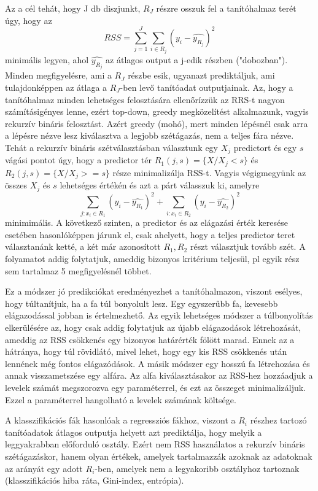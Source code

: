 \documentclass[12pt]{article}
\theoremstyle{plain}
\begin{document}
Az a cél tehát, hogy J db diszjunkt, $R_J$ részre osszuk fel a tanítóhalmaz terét úgy, hogy az $$ RSS = \sum_{j=1}^J \sum_{i \in R_j} (y_i - \hat{y_{R_j}})^2$$ minimális legyen, ahol $\hat{y_{R_j}}$ az átlagos output a j-edik részben ("dobozban"). Minden megfigyelésre, ami a $R_J$ részbe esik, ugyanazt prediktáljuk, ami tulajdonképpen az átlaga a $R_J$-ben levő tanítóadat outputjainak. Az, hogy a tanítóhalmaz minden lehetséges felosztására ellenőrízzük az RRS-t nagyon számításigényes lenne, ezért top-down, greedy megközelítést alkalmazunk, vagyis rekurzív bináris felosztást. Azért greedy (mohó), mert minden lépésnél csak arra a lépésre nézve lesz kiválasztva a legjobb szétágazás, nem a teljes fára nézve. 
Tehát a rekurzív bináris szétválasztásban választunk egy $X_j$ predictort és egy $s$ vágási pontot úgy, hogy a predictor tér $R_1(j, s)=\{X/X_j<s\}$ és $R_2(j, s)=\{X/X_j >= s\}$ része minimalizálja RSS-t. Vagyis végigmegyünk az összes $X_j$ és $s$ lehetséges értékén és azt a párt válasszuk ki, amelyre $$ \sum_{j: x_i \in R_1} (y_i - \hat{y_{R_1}})^2 + \sum_{i: x_i \in R_2} (y_i - \hat{y_{R_2}})^2 $$ minimimális. A következő szinten, a predictor és az elágazási érték keresése esetében hasonlóképpen járunk el, csak ahelyett, hogy a teljes predictor teret választanánk ketté, a két már azonosított $R_1, R_2$ részt választjuk tovább szét. A folyamatot addig folytatjuk, ameddig bizonyos kritérium teljesül, pl egyik rész sem tartalmaz 5 megfigyelésnél többet. 

Ez a módszer jó predikciókat eredményezhet a tanítóhalmazon, viszont esélyes, hogy túltanítjuk, ha a fa túl bonyolult lesz. Egy egyszerűbb fa, kevesebb elágazodással jobban is értelmezhető. Az egyik lehetséges módszer a túlbonyolítás elkerülésére az, hogy csak addig folytatjuk az újabb elágazodások létrehozását, ameddig az RSS csökkenés egy bizonyos határérték fölött marad. Ennek az a hátránya, hogy túl rövidlátó, mivel lehet, hogy egy kis RSS csökkenés után lennének még fontos elágazódások. A másik módszer egy hosszú fa létrehozása és annak visszametszése egy alfára. Az alfa kiválasztásakor az RSS-hez hozzáadjuk a levelek számát megszorozva egy paraméterrel, és ezt az összeget minimalizáljuk. Ezzel a paraméterrel hangolható a levelek számának költsége. 

A klasszifikációs fák hasonlóak a regressziós fákhoz, viszont a $R_i$ részhez tartozó tanítóadatok átlagos outputja helyett azt prediktálja, hogy melyik a leggyakrabban előforduló osztály. Ezért nem RSS használatos a rekurzív bináris szétágazáskor, hanem olyan értékek, amelyek tartalmazzák azoknak az adatoknak az arányát egy adott $R_i$-ben, amelyek nem a legyakoribb osztályhoz tartoznak (klasszifikációs hiba ráta, Gini-index, entrópia). 
\end{document}
